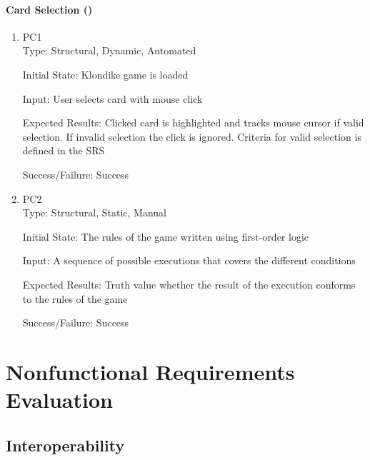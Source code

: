 \documentclass[12pt, titlepage]{article}
\begin{document}
	\paragraph{Card Selection ()}
	\begin{enumerate}
		\item{PC1\\}
		Type: Structural, Dynamic, Automated
		
		Initial State: Klondike game is loaded
		
		Input: User selects card with mouse click
		
		Expected Results: Clicked card is highlighted and tracks mouse cursor if valid 
		selection. If invalid selection the click is ignored. Criteria for valid 
		selection is defined in the SRS

		Success/Failure: Success

		\item{PC2\\}
		Type: Structural, Static, Manual
		
		Initial State: The rules of the game written using first-order logic
		
		Input: A sequence of possible executions that covers the different conditions
		
		Expected Results: Truth value whether the result of the execution conforms to the rules
		of the game

		Success/Failure: Success
	\end{enumerate} 



\section{Nonfunctional Requirements Evaluation}

\subsection{Interoperability}
	
\end{document}
